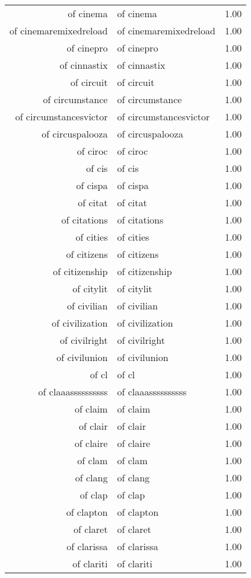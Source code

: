 \begin{table}[ht]
\begin{tabular}{rlr}
  of cinema & of cinema & 1.00 \\ 
  of cinemaremixedreload & of cinemaremixedreload & 1.00 \\ 
  of cinepro & of cinepro & 1.00 \\ 
  of cinnastix & of cinnastix & 1.00 \\ 
  of circuit & of circuit & 1.00 \\ 
  of circumstance & of circumstance & 1.00 \\ 
  of circumstancesvictor & of circumstancesvictor & 1.00 \\ 
  of circuspalooza & of circuspalooza & 1.00 \\ 
  of ciroc & of ciroc & 1.00 \\ 
  of cis & of cis & 1.00 \\ 
  of cispa & of cispa & 1.00 \\ 
  of citat & of citat & 1.00 \\ 
  of citations & of citations & 1.00 \\ 
  of cities & of cities & 1.00 \\ 
  of citizens & of citizens & 1.00 \\ 
  of citizenship & of citizenship & 1.00 \\ 
  of citylit & of citylit & 1.00 \\ 
  of civilian & of civilian & 1.00 \\ 
  of civilization & of civilization & 1.00 \\ 
  of civilright & of civilright & 1.00 \\ 
  of civilunion & of civilunion & 1.00 \\ 
  of cl & of cl & 1.00 \\ 
  of claaassssssssss & of claaassssssssss & 1.00 \\ 
  of claim & of claim & 1.00 \\ 
  of clair & of clair & 1.00 \\ 
  of claire & of claire & 1.00 \\ 
  of clam & of clam & 1.00 \\ 
  of clang & of clang & 1.00 \\ 
  of clap & of clap & 1.00 \\ 
  of clapton & of clapton & 1.00 \\ 
  of claret & of claret & 1.00 \\ 
  of clarissa & of clarissa & 1.00 \\ 
  of clariti & of clariti & 1.00 \\ 

\end{tabular}
\end{table}
